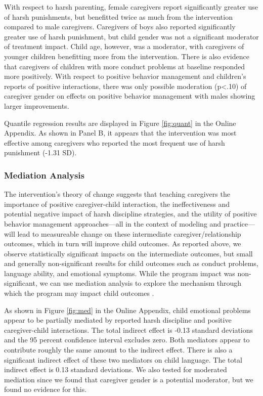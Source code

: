 \documentclass[12pt,authoryear]{elsarticle}\usepackage{knitr}
\begin{document}
With respect to harsh parenting, female caregivers report significantly greater use of harsh punishments, but benefitted twice as much from the intervention compared to male caregivers. Caregivers of boys also reported significantly greater use of harsh punishment, but child gender was not a significant moderator of treatment impact. Child age, however, was a moderator, with caregivers of younger children benefitting more from the intervention. There is also evidence that caregivers of children with more conduct problems at baseline responded more positively. With respect to positive behavior management and children's reports of positive interactions, there was only possible moderation (p<.10) of caregiver gender on effects on positive behavior management with males showing larger improvements. 

Quantile regression results are displayed in Figure \ref{fig:quant} in the Online Appendix. As shown in Panel B, it appears that the intervention was most effective among caregivers who reported the most frequent use of harsh punishment (-1.31 SD).

\subsubsection*{Mediation Analysis}

The intervention's theory of change suggests that teaching caregivers the importance of positive caregiver-child interaction, the ineffectiveness and potential negative impact of harsh discipline strategies, and the utility of positive behavior management approaches---all in the context of modeling and practice---will lead to measureable change on these intermediate caregiver/relationship outcomes, which in turn will improve child outcomes. As reported above, we observe statistically significant impacts on the intermediate outcomes, but small and generally non-significant results for child outcomes such as conduct problems, language ability, and emotional symptoms. While the program impact was non-significant, we can use mediation analysis to explore the mechanism through which the program may impact child outcomes \citep{ORourke:2014}.

As shown in Figure \ref{fig:med} in the Online Appendix, child emotional problems appear to be partially mediated by reported harsh discipline and positive caregiver-child interactions. The total indirect effect is -0.13 standard deviations and the 95 percent confidence interval excludes zero. Both mediators appear to contribute roughly the same amount to the indirect effect. There is also a significant indirect effect of these two mediators on child language. The total indirect effect is 0.13 standard deviations. We also tested for moderated mediation since we found that caregiver gender is a potential moderator, but we found no evidence for this.
\end{document}
